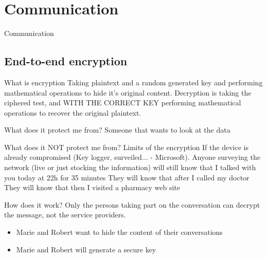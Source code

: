 \documentclass[11pt]{beamer}
\begin{document}
\section{Communication}
\begin{frame}{Communication}


\end{frame}
\subsection{End-to-end encryption}
\begin{frame}{What is encryption}
Taking plaintext and a random generated key and performing mathematical operations to hide it's original content.
Decryption is taking the ciphered test, and WITH THE CORRECT KEY performing mathematical operations to recover the original plaintext.
\end{frame}
\begin{frame}{What does it protect me from?}
Someone that wants to look at the data

\end{frame}
\begin{frame}{What does it NOT protect me from? Limits of the encryption}
If the device is already compromised (Key logger, surveiled...  -  Microsoft). 
Anyone surveying the network (live or just stocking the information) will still know that I talked with you today at 22h for  35 minutes
They will know that after I called  my doctor
They will know that then I visited a pharmacy web site
\end{frame}
\begin{frame}{How does it work?}
Only the persons taking part on the conversation can decrypt the message, not the service providers.
\begin{itemize}
\item Marie and Robert want to hide the content of their conversations
\item Marie and Robert will generate a secure key 
\end{itemize}

\end{frame}
\end{document}

